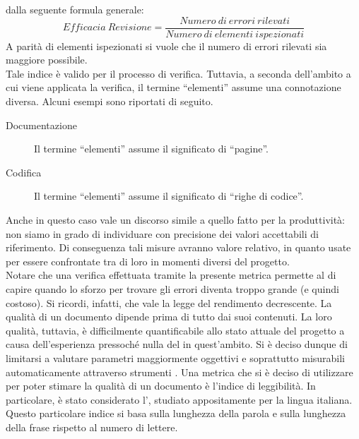 					dalla seguente formula generale:
					\begin{equation} \label{eq:efficaciarevisione}
						Efficacia\ Revisione = \frac{Numero\ di\ errori\ rilevati}{Numero\ di\ elementi\ ispezionati}
					\end{equation}
					A parità di elementi ispezionati si vuole che il numero di errori rilevati sia maggiore possibile.\\
					Tale indice è valido per il processo di verifica. Tuttavia, a seconda dell'ambito a cui viene applicata la verifica, il termine 
					“elementi” assume una connotazione diversa. Alcuni esempi sono riportati di seguito.
					\begin{description}
						\item[Documentazione] Il termine “elementi” assume il significato di “pagine”.
						\item[Codifica] Il termine “elementi” assume il significato di “righe di codice”.
					\end{description}
					Anche in questo caso vale un discorso simile a quello fatto per la produttività: non siamo in grado di individuare con 
					precisione dei valori accettabili di riferimento. Di conseguenza tali misure avranno valore relativo, in quanto usate per essere 
					confrontate tra di loro in momenti diversi del progetto.\\
					Notare che una verifica effettuata tramite la presente metrica permette al  di capire quando lo sforzo per 
					trovare gli errori diventa troppo grande (e quindi costoso). Si ricordi, infatti, che vale la legge del rendimento decrescente.
				La qualità di un documento dipende prima di tutto dai suoi contenuti. La loro qualità, tuttavia, è difficilmente quantificabile allo 
				stato attuale del progetto a causa dell'esperienza pressoché nulla del  in quest'ambito. Si è deciso dunque di limitarsi a valutare 
				parametri maggiormente oggettivi e soprattutto misurabili automaticamente attraverso strumenti .
					Una metrica che si è deciso di utilizzare per poter stimare la qualità di un documento è l'indice di leggibilità. In particolare, è 
					stato considerato l', studiato appositamente per la lingua italiana.\\
					Questo particolare indice si basa sulla lunghezza della parola e sulla lunghezza della frase rispetto al numero di lettere.\\
